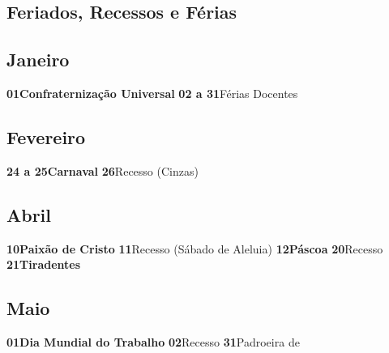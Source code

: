 \documentclass[thesis]{hmcposter}
\begin{document}
\begin{poster}
\newpage\onespacing \small \section{\color{hmcorange}Feriados, Recessos e Férias}\subsection{Janeiro}\textbf{01}\quad \quad \quad \quad \textbf{Confraternização Universal} \newline\textbf{02 a 31}\quad \quad Férias Docentes \newline\subsection{Fevereiro}\textbf{24 a 25}\quad \quad \textbf{Carnaval} \newline\textbf{26}\quad \quad \quad \quad Recesso (Cinzas) \newline\subsection{Abril}\textbf{10}\quad \quad \quad \quad \textbf{Paixão de Cristo} \newline\textbf{11}\quad \quad \quad \quad Recesso (Sábado de Aleluia) \newline\textbf{12}\quad \quad \quad \quad \textbf{Páscoa} \newline\textbf{20}\quad \quad \quad \quad Recesso \newline\textbf{21}\quad \quad \quad \quad \textbf{Tiradentes} \newline\subsection{Maio}\textbf{01}\quad \quad \quad \quad \textbf{Dia Mundial do Trabalho} \newline\textbf{02}\quad \quad \quad \quad Recesso \newline\textbf{31}\quad \quad \quad \quad Padroeira de 
\end{poster}
\end{document}
